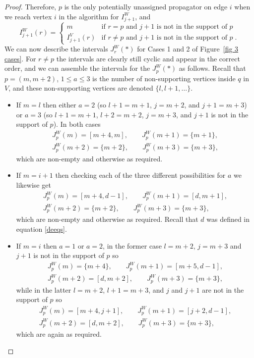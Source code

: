 \documentclass[11pt]{article}
\theoremstyle{remark}
\theoremstyle{definition}
\begin{document}
\begin{proof}
Therefore, $p$ is the only potentially unassigned propagator on edge $i$ when we reach vertex $i$ in the algorithm for $I_{j+1}^W$, and
    \[
    I_{j+1}^{W}(r)  = \begin{cases}
      m & \text{if  $r=p$ and $j+1$ is not in the support of $p$}\\
      I_{j+1}^{V}(r) & \text{if  $r\neq p$ and $j+1$ is not in the support of $p$} \;.
    \end{cases}
    \]
We can now describe the intervals $J^{W}_r(*)$ for Cases 1 and 2 of Figure~\ref{fig 3 cases}. For $r \neq p$ the intervals are clearly still cyclic and appear in the correct order, and we can assemble the intervals for the $J_p^{W}(*)$ as follows. Recall that $p = (m,m+2)$, $1 \leq a \leq 3$ is the number of non-supporting vertices inside $q$ in $V$, and these non-supporting vertices are denoted $\{l,l+1, \dots\}$. 
    \begin{itemize}
      \item 
    If $m=l$ then either $a=2$ (so $l+1=m+1$, $j=m+2$, and $j+1=m+3$) or $a=3$ (so $l+1=m+1$, $l+2=m+2$, $j=m+3$, and $j+1$ is not in the support of $p$).  In both cases
    \begin{gather*}
    J^{W}_p(m) = [m+4, m], \qquad  J^{W}_p(m+1) = \{m+1\}, \\ J^{W}_p(m+2) = \{m+2\}, \qquad  J^{W}_p(m+3) = \{m+3\},
    \end{gather*}
    which are non-empty and otherwise as required.
  \item
        If $m=i+1$ then checking each of the three different possibilities for $a$ we likewise get
    \begin{gather*}
    J^{W}_p(m) = [m+4, d-1], \qquad  J^{W}_p(m+1) = [d, m+1], \\  J^{W}_p(m+2) = \{m+2\}, \qquad  J^{W}_p(m+3) = \{m+3\},
    \end{gather*}
    which are non-empty and otherwise as required. Recall that $d$ was defined in equation \eqref{deeqs}.
  \item If $m=i$ then $a=1$ or $a=2$, in the former case $l=m+2$, $j=m+3$ and $j+1$ is not in the support of $p$ so
    \begin{gather*}
    J^{W}_p(m) = \{m+4\}, \qquad  J^{W}_p(m+1) = [m+5, d-1], \\  J^{W}_p(m+2) = [d, m+2], \qquad  J^{W}_p(m+3) = \{m+3\},
    \end{gather*}
    while in the latter $l=m+2$, $l+1=m+3$, and $j$ and $j+1$ are not in the support of $p$ so
    \begin{gather*}
    J^{W}_p(m) = [m+4, j+1], \qquad  J^{W}_p(m+1) = [j+2, d-1], \\  J^{W}_p(m+2) = [d, m+2], \qquad  J^{W}_p(m+3) = \{m+3\},
    \end{gather*}
    which are again as required.
    \end{itemize}


\end{proof}
\end{document}
